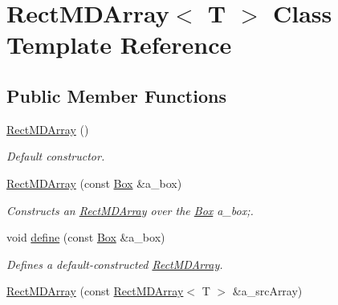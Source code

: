 \hypertarget{classRectMDArray}{}\section{Rect\+M\+D\+Array$<$ T $>$ Class Template Reference}
\label{classRectMDArray}
\subsection*{Public Member Functions}
\begin{DoxyCompactItemize}
\item 
\hypertarget{classRectMDArray_ac00866b851e65694dd67da2bcb66589b}{}\hyperlink{classRectMDArray_ac00866b851e65694dd67da2bcb66589b}{Rect\+M\+D\+Array} ()\label{classRectMDArray_ac00866b851e65694dd67da2bcb66589b}

\begin{DoxyCompactList}\small\item\em Default constructor. \end{DoxyCompactList}\item 
\hypertarget{classRectMDArray_a3ebeb8a94543970a6e4c04e97bb09407}{}\hyperlink{classRectMDArray_a3ebeb8a94543970a6e4c04e97bb09407}{Rect\+M\+D\+Array} (const \hyperlink{classBox}{Box} \&a\+\_\+box)\label{classRectMDArray_a3ebeb8a94543970a6e4c04e97bb09407}

\begin{DoxyCompactList}\small\item\em Constructs an \hyperlink{classRectMDArray}{Rect\+M\+D\+Array} over the \hyperlink{classBox}{Box} a\+\_\+box;. \end{DoxyCompactList}\item 
\hypertarget{classRectMDArray_a4eac73fde8106984c7970fab82b2c146}{}void \hyperlink{classRectMDArray_a4eac73fde8106984c7970fab82b2c146}{define} (const \hyperlink{classBox}{Box} \&a\+\_\+box)\label{classRectMDArray_a4eac73fde8106984c7970fab82b2c146}

\begin{DoxyCompactList}\small\item\em Defines a default-\/constructed \hyperlink{classRectMDArray}{Rect\+M\+D\+Array}. \end{DoxyCompactList}\item 
\hypertarget{classRectMDArray_ae151647324ccd43e30a893a1edb03e83}{}\hyperlink{classRectMDArray_ae151647324ccd43e30a893a1edb03e83}{Rect\+M\+D\+Array} (const \hyperlink{classRectMDArray}{Rect\+M\+D\+Array}$<$ T $>$ \&a\+\_\+src\+Array)\label{classRectMDArray_ae151647324ccd43e30a893a1edb03e83}


\end{DoxyCompactItemize}
